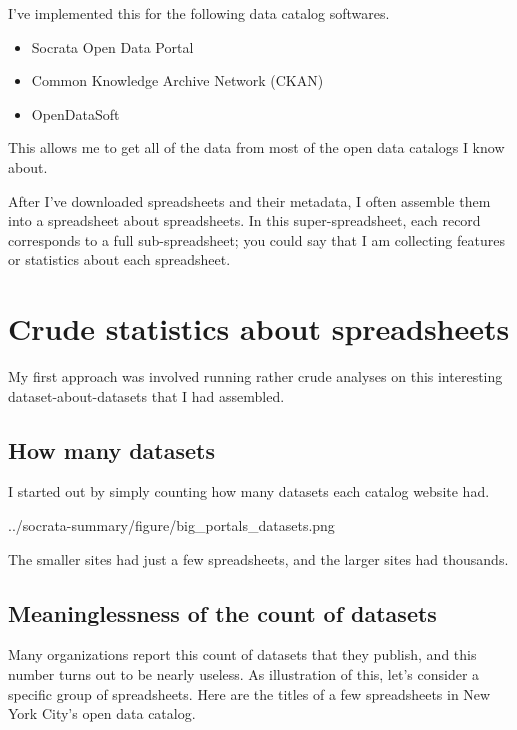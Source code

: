 \documentclass{acm_proc_article-sp}
\begin{document}
I've implemented this for the following data catalog softwares.

\begin{itemize}
\item Socrata Open Data Portal
\item Common Knowledge Archive Network (CKAN)
\item OpenDataSoft
\end{itemize}

This allows me to get all of the data from most of the open data catalogs I know about.

After I've downloaded spreadsheets and their metadata,
I often assemble them into a spreadsheet about spreadsheets. \cite{data-driven}
In this super-spreadsheet, each record corresponds to a full
sub-spreadsheet; you could say that I am collecting features or statistics
about each spreadsheet.

\section{Crude statistics about spreadsheets}
My first approach was involved running rather crude analyses on this
interesting dataset-about-datasets that I had assembled.

\subsection{How many datasets}
I started out by simply counting how many datasets each catalog website had.

{../socrata-summary/figure/big_portals_datasets.png}

The smaller sites had just a few spreadsheets, and the larger sites had thousands.

\subsection{Meaninglessness of the count of datasets}
Many organizations report this count of datasets that they publish, and this number
turns out to be nearly useless. As illustration of this, let's consider a specific
group of spreadsheets. Here are the titles of a few spreadsheets in New York City's
open data catalog.
\end{document}
